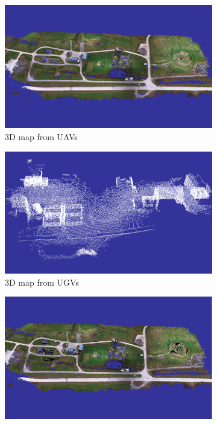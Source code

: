 \documentclass{article}
\begin{document}
\begin{figure} [h]
    \centering
    \begin{subfigure} [b]{0.45\textwidth}
         \centering
         \includegraphics[scale=0.552]{ROB-15-0035_fig34a.png}
         \caption{3D map from UAVs}
         \label{fig:MeFuav}
    \end{subfigure}%
    \begin{subfigure} [b]{0.45\textwidth}
         \centering
         \includegraphics[scale=0.2532]{ROB-15-0035_fig34b.png}
         \caption{3D map from UGVs}
         \label{fig:MeFugv1}
    \end{subfigure}
    \begin{subfigure} [b]{0.45\textwidth}
         \centering
         \includegraphics[scale=0.459]{ROB-15-0035_fig34c.png}

\end{subfigure}
\end{figure}
\end{document}
